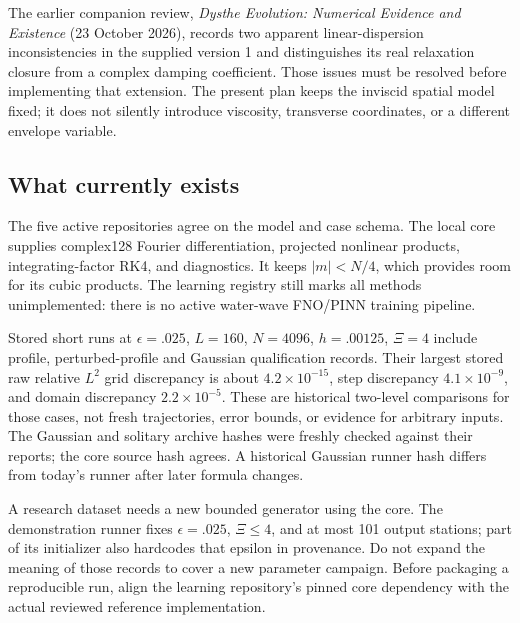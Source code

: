 \documentclass[11pt]{article}
\begin{document}
The earlier companion review, \emph{Dysthe Evolution: Numerical Evidence
and Existence} (23 October 2026), records two apparent linear-dispersion
inconsistencies in the supplied version 1 and distinguishes its real
relaxation closure from a complex damping coefficient. Those issues
must be resolved before implementing that extension. The present plan
keeps the inviscid spatial model fixed; it does not silently introduce
viscosity, transverse coordinates, or a different envelope variable.

\subsection{What currently exists}
The five active repositories agree on the model and case schema.
The local core supplies complex128 Fourier differentiation, projected
nonlinear products, integrating-factor RK4, and diagnostics. It keeps
$|m|<N/4$, which provides room for its cubic products. The learning
registry still marks all methods unimplemented: there is no active
water-wave FNO/PINN training pipeline.

Stored short runs at $\epsilon=.025$, $L=160$, $N=4096$,
$h=.00125$, $\Xi=4$ include profile, perturbed-profile and Gaussian
qualification records. Their largest stored raw relative $L^2$
grid discrepancy is about $4.2\times10^{-15}$, step discrepancy
$4.1\times10^{-9}$, and domain discrepancy $2.2\times10^{-5}$.
These are historical two-level comparisons for those cases, not
fresh trajectories, error bounds, or evidence for arbitrary inputs.
The Gaussian and solitary archive hashes were freshly checked against
their reports; the core source hash agrees. A historical Gaussian
runner hash differs from today's runner after later formula changes.

A research dataset needs a new bounded generator using the core.
The demonstration runner fixes $\epsilon=.025$, $\Xi\leq4$, and
at most 101 output stations; part of its initializer also hardcodes
that epsilon in provenance. Do not expand the meaning of those records
to cover a new parameter campaign. Before packaging a reproducible run,
align the learning repository's pinned core dependency with the actual
reviewed reference implementation.







\appendix
\end{document}
